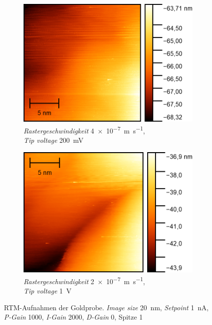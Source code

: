 \begin{figure}[H]
    \centering
    \begin{subfigure}{0.45\textwidth}
        \centering
        \includegraphics[width=\linewidth]{../figs/Gold10483}
        \caption{\textit{Rastergeschwindigkeit} \SI{4e-7}{\meter \per \second},\\ \textit{Tip voltage} \SI{200}{\milli \volt}}
    \end{subfigure}
    \begin{subfigure}{0.45\textwidth}
        \centering
        \includegraphics[width=\linewidth]{../figs/Gold10490}
        \caption{\textit{Rastergeschwindigkeit} \SI{2e-7}{\meter \per \second},\\ \textit{Tip voltage} \SI{1}{\volt}}
    \end{subfigure}
    \caption{RTM-Aufnahmen der Goldprobe. \textit{Image size} \SI{20}{\nano \meter}, \textit{Setpoint} \SI{1}{\nano \ampere},
    \textit{P-Gain} \num{1000}, \textit{I-Gain} \num{2000}, \textit{D-Gain} \num{0}, Spitze 1}\label{fig:gold5}
\end{figure}
